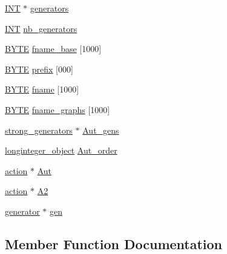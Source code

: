 \begin{DoxyCompactItemize}
\item 
\mbox{\hyperlink{galois_8h_a09fddde158a3a20bd2dcadb609de11dc}{I\+NT}} $\ast$ \mbox{\hyperlink{classcayley__graph__search_a69453b8af06a9ba6647252d9bb61e878}{generators}}
\item 
\mbox{\hyperlink{galois_8h_a09fddde158a3a20bd2dcadb609de11dc}{I\+NT}} \mbox{\hyperlink{classcayley__graph__search_a2658bdfaf0bc19d91040552ebf8364ec}{nb\+\_\+generators}}
\item 
\mbox{\hyperlink{galois_8h_ab6cc7b4aeb6ea31aba2b3fbfc83ff5e6}{B\+Y\+TE}} \mbox{\hyperlink{classcayley__graph__search_abfb2364d526350b274d4e861111a8f79}{fname\+\_\+base}} \mbox{[}1000\mbox{]}
\item 
\mbox{\hyperlink{galois_8h_ab6cc7b4aeb6ea31aba2b3fbfc83ff5e6}{B\+Y\+TE}} \mbox{\hyperlink{classcayley__graph__search_a5d64d2e2582a07f711e7d0dd52a46b74}{prefix}} \mbox{[}000\mbox{]}
\item 
\mbox{\hyperlink{galois_8h_ab6cc7b4aeb6ea31aba2b3fbfc83ff5e6}{B\+Y\+TE}} \mbox{\hyperlink{classcayley__graph__search_aac8dfecb7be6aa107efc46afe06afbe1}{fname}} \mbox{[}1000\mbox{]}
\item 
\mbox{\hyperlink{galois_8h_ab6cc7b4aeb6ea31aba2b3fbfc83ff5e6}{B\+Y\+TE}} \mbox{\hyperlink{classcayley__graph__search_aa94047a78217c17c4f674fa550feeded}{fname\+\_\+graphs}} \mbox{[}1000\mbox{]}
\item 
\mbox{\hyperlink{classstrong__generators}{strong\+\_\+generators}} $\ast$ \mbox{\hyperlink{classcayley__graph__search_aaf74c0cffb3f7f2706f5aa337e8b2f00}{Aut\+\_\+gens}}
\item 
\mbox{\hyperlink{classlonginteger__object}{longinteger\+\_\+object}} \mbox{\hyperlink{classcayley__graph__search_a30202126fe458a6c20e1d770224b8b30}{Aut\+\_\+order}}
\item 
\mbox{\hyperlink{classaction}{action}} $\ast$ \mbox{\hyperlink{classcayley__graph__search_a44deec28218be5fa9dd7525450c0660b}{Aut}}
\item 
\mbox{\hyperlink{classaction}{action}} $\ast$ \mbox{\hyperlink{classcayley__graph__search_a179747d91486fa3778333351e23c887a}{A2}}
\item 
\mbox{\hyperlink{classgenerator}{generator}} $\ast$ \mbox{\hyperlink{classcayley__graph__search_a8c3b96b035ca7ac16340363f5156f3e3}{gen}}
\end{DoxyCompactItemize}


\subsection{Member Function Documentation}
\mbox{\label{classcayley__graph__search_a4cf8a90752e018a281481ac80ad52c4b}} 
